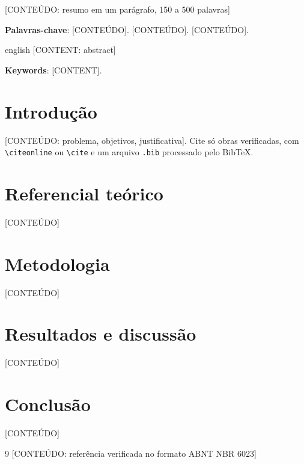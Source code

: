 \documentclass[12pt,openright,oneside,a4paper,english,brazil]{abntex2}
\begin{document}
\frenchspacing

\imprimircapa
\imprimirfolhaderosto

\begin{resumo}
{}[CONTEÚDO: resumo em um parágrafo, 150 a 500 palavras]

\textbf{Palavras-chave}: [CONTEÚDO]. [CONTEÚDO]. [CONTEÚDO].
\end{resumo}

\begin{resumo}[Abstract]
\begin{otherlanguage*}{english}
{}[CONTENT: abstract]

\vspace{\onelineskip}
\noindent\textbf{Keywords}: [CONTENT].
\end{otherlanguage*}
\end{resumo}

\tableofcontents*
\cleardoublepage

\textual

\chapter{Introdução}
{}[CONTEÚDO: problema, objetivos, justificativa]. Cite só obras verificadas, com \texttt{\textbackslash citeonline} ou \texttt{\textbackslash cite} e um arquivo \texttt{.bib} processado pelo BibTeX.

\chapter{Referencial teórico}
{}[CONTEÚDO]

\chapter{Metodologia}
{}[CONTEÚDO]

\begin{table}[htb]
\end{table}

\chapter{Resultados e discussão}
{}[CONTEÚDO]

\chapter{Conclusão}
{}[CONTEÚDO]

\postextual
\begin{thebibliography}{9}
 [CONTEÚDO: referência verificada no formato ABNT NBR 6023]
\end{thebibliography}
\end{document}
